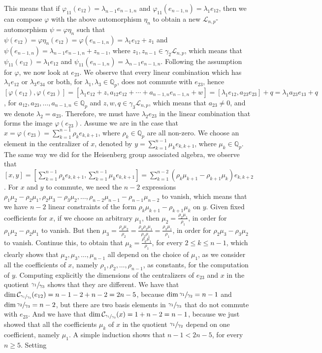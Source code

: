 \documentclass[12pt]{article}
\begin{document}
This means that if $\varphi_{11}(e_{12})=\lambda_{n-1}e_{n-1,n}$ and $\varphi_{11}(e_{n-1,n})=\lambda_1 e_{12}$, then we can compose $\varphi$ with the above automorphism $\eta_n$ to obtain a new $\mathcal{L}_{n,p}$-automorphism $\psi=\varphi\eta_n$ such that $\psi(e_{12})=\varphi\eta_n(e_{12})=\varphi(e_{n-1,n})=\lambda_1 e_{12}+z_1$ and $\psi(e_{n-1,n})=\lambda_{n-1}e_{n-1,n}+z_{n-1}$, where $z_1,z_{n-1}\in\gamma_2\mathcal{L}_{n,p}$, which means that $\psi_{11}(e_{12})=\lambda_1 e_{12}$ and $\psi_{11}(e_{n-1,n})=\lambda_{n-1}e_{n-1,n}$. Following the assumption for $\varphi$, we now look at $e_{23}$. We observe that every linear combination which has $\lambda_1 e_{12}$ or $\lambda_3 e_{34}$ or both, for $\lambda_1,\lambda_3\in\mathbb{Q}_p$, does not commute with $e_{23}$, hence $[\varphi(e_{12}),\varphi(e_{23})]=[\lambda_1 e_{12}+z,a_{12}e_{12}+\cdots+a_{n-1,n}e_{n-1,n}+w]=[\lambda_1 e_{12},a_{23}e_{23}]+q=\lambda_1 a_{23}e_{13}+q$, for $a_{12},a_{23},\dots,a_{n-1,n}\in\mathbb{Q}_p$ and $z,w,q\in\gamma_3\mathcal{L}_{n,p}$, which means that $a_{23}\neq 0$, and we denote $\lambda_2=a_{23}$. Therefore, we must have $\lambda_2 e_{23}$ in the linear combination that forms the image $\varphi(e_{23})$. Assume we are in the case that $x=\varphi(e_{23})=\sum_{k=1}^{n-1}\rho_k e_{k,k+1}$, where $\rho_k\in\mathbb{Q}_p$ are all non-zero. We choose an element in the centralizer of $x$, denoted by $y=\sum_{k=1}^{n-1}\mu_k e_{k,k+1}$, where $\mu_k\in\mathbb{Q}_p$. The same way we did for the Heisenberg group associated algebra, we observe that $[x,y]=[\sum_{k=1}^{n-1}\rho_k e_{k,k+1},\sum_{k=1}^{n-1}\mu_k e_{k,k+1}]=\sum_{k=1}^{n-2}(\rho_k\mu_{k+1}-\rho_{k+1}\mu_k)e_{k,k+2}$. For $x$ and $y$ to commute, we need the $n-2$ expressions $\rho_1\mu_2-\rho_2\mu_1,\rho_2\mu_3-\rho_3\mu_2,\dots,\rho_{n-2}\mu_{n-1}-\rho_{n-1}\mu_{n-2}$ to vanish, which means that we have $n-2$ linear constraints of the form $\rho_k\mu_{k+1}-\rho_{k+1}\mu_k$ on $y$. Given fixed coefficients for $x$, if we choose an arbitrary $\mu_1$, then $\mu_2=\frac{\rho_2\mu_1}{\rho_1}$, in order for $\rho_1\mu_2-\rho_2\mu_1$ to vanish. But then $\mu_3=\frac{\rho_3\mu_2}{\rho_2}=\frac{\rho_3\rho_2\mu_1}{\rho_2\rho_1}=\frac{\rho_3\mu_1}{\rho_1}$, in order for $\rho_2\mu_3-\rho_3\mu_2$ to vanish. Continue this, to obtain that $\mu_k=\frac{\rho_k\mu_1}{\rho_1}$, for every $2\leq k\leq n-1$, which clearly shows that $\mu_2,\mu_3,\dots,\mu_{n-1}$ all depend on the choice of $\mu_1$, as we consider all the coefficients of $x$, namely $\rho_1,\rho_2,\dots,\rho_{n-1}$, as constants, for the computation of $y$. Computing explicitly the dimensions of the centralizers of $e_{23}$ and $x$ in the quotient $\sfrac{\gamma_1}{\gamma_3}$ shows that they are different. We have that $\dim\mathcal{C}_{\sfrac{\gamma_1}{\gamma_3}}(e_{12})=n-1-2+n-2=2n-5$, because $\dim\sfrac{\gamma_1}{\gamma_2}=n-1$ and $\dim\sfrac{\gamma_2}{\gamma_3}=n-2$, but there are two basis elements in $\sfrac{\gamma_1}{\gamma_3}$ that do not commute with $e_{23}$. And we have that $\dim\mathcal{C}_{\sfrac{\gamma_1}{\gamma_3}}(x)=1+n-2=n-1$, because we just showed that all the coefficients $\mu_k$ of $x$ in the quotient $\sfrac{\gamma_1}{\gamma_2}$ depend on one coefficient, namely $\mu_1$. A simple induction shows that $n-1<2n-5$, for every $n\geq 5$. Setting 
\end{document}
